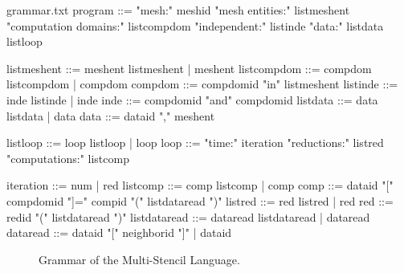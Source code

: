 \begin{filecontents*}{grammar.txt}
program ::= "mesh:" meshid 
            "mesh entities:" listmeshent
            "computation domains:" 
                       listcompdom
            "independent:"
                       listinde
            "data:" listdata
            listloop

listmeshent ::= meshent listmeshent |  meshent
listcompdom ::= compdom listcompdom |  compdom
compdom ::= compdomid "in" listmeshent
listinde ::= inde listinde |  inde
inde ::= compdomid "and" compdomid
listdata ::= data listdata |  data
data ::= dataid "," meshent

listloop ::= loop listloop | loop
loop ::=  "time:" iteration
          "reductions:" listred
          "computations:" listcomp
          
iteration ::= num | red
listcomp ::= comp listcomp |  comp
comp ::= dataid "[" compdomid "]=" compid "(" listdataread ")"
listred ::= red listred | red
red ::= redid "(" listdataread ")"
listdataread ::= dataread listdataread |  dataread
dataread ::= dataid "[" neighborid "]" |  dataid
\end{filecontents*}

\begin{figure}[t]
  \hspace{5mm}
  \begin{minipage}[t]{\textwidth}
    {}   
    \caption{Grammar of the Multi-Stencil Language. \label{fig:grammar}}
  \end{minipage}
\end{figure}